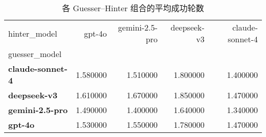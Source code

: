\begin{table}
\caption{各 Guesser–Hinter 组合的平均成功轮数}
\label{tab:avg_turns}
\begin{tabular}{lrrrr}
\toprule
hinter_model & gpt-4o & gemini-2.5-pro & deepseek-v3 & claude-sonnet-4 \\
guesser_model &  &  &  &  \\
\midrule
\textbf{claude-sonnet-4} & 1.580000 & 1.510000 & 1.800000 & 1.400000 \\
\textbf{deepseek-v3} & 1.610000 & 1.670000 & 1.850000 & 1.470000 \\
\textbf{gemini-2.5-pro} & 1.490000 & 1.400000 & 1.640000 & 1.340000 \\
\textbf{gpt-4o} & 1.530000 & 1.550000 & 1.780000 & 1.470000 \\
\bottomrule
\end{tabular}
\end{table}
